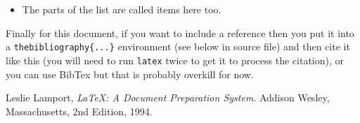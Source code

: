 \documentclass[a4wide, 11pt]{article}
\begin{document}
\begin{itemize}

    \item
    The parts of the list are called items here too.
    
\end{itemize}

Finally for this document, if you want to include a reference
then you put it into a \texttt{thebibliography\{...\}}
environment (see below in source file) and then 
cite it like this \cite{lamport94}
(you will need to run \texttt{latex} twice to get it to process the citation),
or you can use BibTex but that is probably overkill for now.

\begin{thebibliography}{9}

  Leslie Lamport,
  \emph{\LaTeX: A Document Preparation System}.
  Addison Wesley, Massachusetts,
  2nd Edition,
  1994.

\end{thebibliography}
\end{document}
